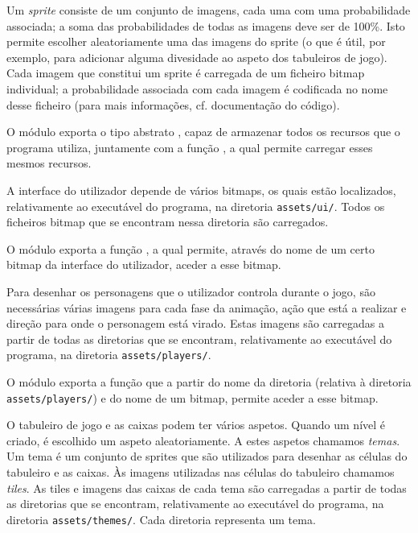 \documentclass[a4paper]{article}
\begin{document}
Um \emph{sprite} consiste de um conjunto de imagens, cada uma com uma probabilidade associada; a soma das probabilidades de todas as imagens deve ser de 100\%. Isto permite escolher aleatoriamente uma das imagens do sprite (o que é útil, por exemplo, para adicionar alguma divesidade ao aspeto dos tabuleiros de jogo). Cada imagem que constitui um sprite é carregada de um ficheiro bitmap individual; a probabilidade associada com cada imagem é codificada no nome desse ficheiro (para mais informações, cf. documentação do código).

\bigskip

O módulo exporta o tipo abstrato , capaz de armazenar todos os recursos que o programa utiliza, juntamente com a função , a qual permite carregar esses mesmos recursos.

\bigskip

A interface do utilizador depende de vários bitmaps, os quais estão localizados, relativamente ao executável do programa, na diretoria \texttt{assets/ui/}. Todos os ficheiros bitmap que se encontram nessa diretoria são carregados.

O módulo exporta a função , a qual permite, através do nome de um certo bitmap da interface do utilizador, aceder a esse bitmap.

\bigskip

Para desenhar os personagens que o utilizador controla durante o jogo, são necessárias várias imagens para cada fase da animação, ação que está a realizar e direção para onde o personagem está virado. Estas imagens são carregadas a partir de todas as diretorias que se encontram, relativamente ao executável do programa, na diretoria \texttt{assets/players/}.

O módulo exporta a função  que a partir do nome da diretoria (relativa à diretoria \texttt{assets/players/}) e do nome de um bitmap, permite aceder a esse bitmap.

\bigskip

O tabuleiro de jogo e as caixas podem ter vários aspetos. Quando um nível é criado, é escolhido um aspeto aleatoriamente. A estes aspetos chamamos \emph{temas}. Um tema é um conjunto de sprites que são utilizados para desenhar as células do tabuleiro e as caixas. Às imagens utilizadas nas células do tabuleiro chamamos \emph{tiles}. As tiles e imagens das caixas de cada tema são carregadas a partir de todas as diretorias que se encontram, relativamente ao executável do programa, na diretoria \texttt{assets/themes/}. Cada diretoria representa um tema.
\end{document}
